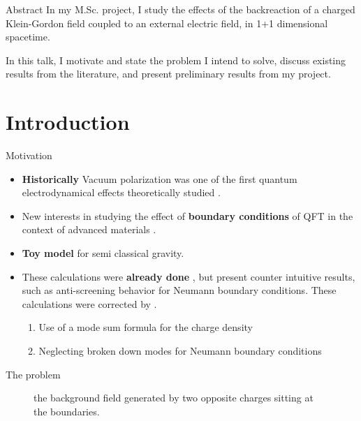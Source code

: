 \begin{frame}{Abstract}
	In my M.Sc. project, I study the effects of the backreaction of a charged Klein-Gordon field coupled to an external electric field, in 1+1 dimensional spacetime.

In this talk, I motivate and state the problem I intend to solve, discuss existing results from the literature, and present preliminary results from my project.

\end{frame}

\section{Introduction}

\begin{frame}{Motivation}
	\begin{itemize}[<+->]
		\item \textbf{Historically} Vacuum polarization was one of the first quantum electrodynamical effects theoretically studied \cite{Uehl1935, Heis1936}.
		\item New interests in studying the effect of \textbf{boundary conditions} of QFT in the context of advanced materials  \cite{Fial2019}.
		\item \textbf{Toy model} for semi classical gravity. \cite{Wroc2011}
		\item  These calculations were \textbf{already done} \cite{Ambj1983}, but present counter intuitive results, such as anti-screening behavior for Neumann boundary conditions. These calculations were corrected by \cite{Wern2020}.
		\begin{enumerate}
			\item Use of a mode sum formula for the charge density
			\item Neglecting broken down modes for Neumann boundary conditions
		\end{enumerate}
\end{itemize}
	
\end{frame}

\begin{frame}{The problem}
		    \begin{figure}[ht]
		        \centering
		        \caption{the background field generated by two opposite charges sitting at the boundaries.}
		        \label{fig:the-background-field-generated-by-two-opposite-charges-sitting-at-the-boundaries.}
		    \end{figure}
\end{frame}

